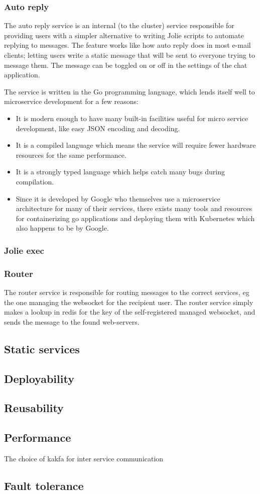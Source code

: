 \subsubsection{Auto reply}
The auto reply service is an internal (to the cluster) service responsible for providing users with a simpler alternative to writing Jolie scripts to automate replying to messages. The feature works like how auto reply does in most e-mail clients; letting users write a static message that will be sent to everyone trying to message them. The message can be toggled on or off in the settings of the chat application.

The service is written in the Go programming language, which lends itself well to microservice development for a few reasons:

\begin{itemize}
	\item It is modern enough to have many built-in facilities useful for micro service development, like easy JSON encoding and decoding.
	\item It is a compiled language which means the service will require fewer hardware resources for the same performance.
	\item It is a strongly typed language which helps catch many bugs during compilation.
	\item Since it is developed by Google who themselves use a microservice architecture for many of their services, there exists many tools and resources for containerizing go applications and deploying them with Kubernetes which also happens to be by Google.
\end{itemize}

\subsubsection{Jolie exec}
\subsubsection{Router}
The router service is responsible for routing messages to the correct services, eg the one managing the websocket for the recipient user.
The router service simply makes a lookup in redis for the key of the self-registered managed websocket, and sends the message to the found web-servers.
\subsection{Static services}
\subsection{Deployability}
\subsection{Reusability}
\subsection{Performance}
The choice of kakfa for inter service communication 
\subsection{Fault tolerance}